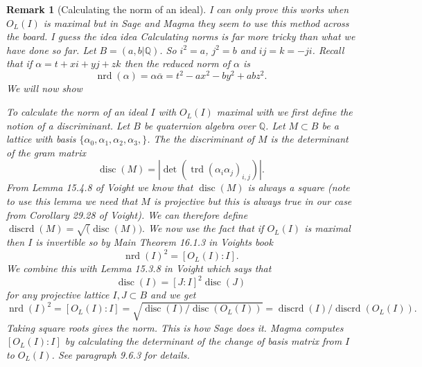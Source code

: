 \documentclass[10pt]{article}
\theoremstyle{plain}
\newtheorem{remark}[theorem]{Remark}
\theoremstyle{definition}
\newcommand{\op}{\operatorname}
\newcommand{\Q}{\mathbb{Q}}
\newcommand{\nrd}{\op{nrd}}
\newcommand{\trd}{\op{trd}}
\newcommand{\disc}{\op{disc}}
\begin{document}
\begin{remark}[Calculating the norm of an ideal]
    {\color{red} I can only prove this works when \( O_L(I) \) is maximal but in Sage and Magma they seem to use this method across the board. I guess the idea idea }
    Calculating norms is far more tricky than what we have done so far.
    Let \( B = (a, b | \Q )\).
    So \( i^2 = a \), \( j^2 = b \) and \( ij = k = -ji \).
    Recall that if \( \alpha = t + xi + yj + zk \) then the reduced norm of \( \alpha \) is
    \[
        \nrd(\alpha) = \alpha \overline{\alpha} = t^2 - ax^2 - by^2 + abz^2.
    \]
    We will now show


    To calculate the norm of an ideal \( I \) with \( O_L(I) \) maximal with  we first define the notion of a \emph{discriminant}.
    Let \( B \) be quaternion algebra over \( \Q \).
    Let \( M \subset B \) be a lattice with basis \( \{\alpha_0, \alpha_1, \alpha_2, \alpha_3,\} \).
    The the discriminant of \( M \) is the determinant of the gram matrix
    \[
        \disc(M) = |\det(\trd(\alpha_i \alpha_j)_{i, j})|.
    \]
    From Lemma 15.4.8 of Voight we know that \( \disc(M) \) is always a square (note to use this lemma we need that \( M \) is projective but this is always true in our case from Corollary 29.28 of Voight).
    We can therefore define \( \op{discrd}(M) = \sqrt(\disc(M)). \)
    We now use the fact that if \( O_L(I) \) is maximal then \( I \) is invertible so by Main Theorem 16.1.3 in Voights book
    \[
        \nrd(I)^2 = [O_L(I) : I].
    \]
    We combine this with Lemma 15.3.8 in Voight which says that
    \[
        \disc(I) = [J : I]^2\disc(J)
    \]
    for any projective lattice \( I, J \subset B \) and we get
    \[
        \nrd(I)^2
        = [O_L(I) : I]
        = \sqrt{\disc(I) / \disc(O_L(I))}
        = \op{discrd}(I) / \op{discrd}(O_L(I)).
    \]
    Taking square roots gives the norm.
    This is how Sage does it.
    Magma computes \( [O_L(I) : I] \) by calculating the determinant of the change of basis matrix from \( I \) to \( O_L(I) \).
    See paragraph 9.6.3 for details.
\end{remark}
\end{document}
